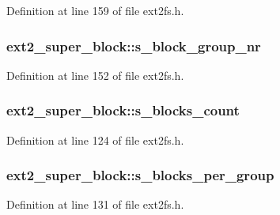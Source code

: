 \-Definition at line 159 of file ext2fs.\-h.

\hypertarget{structext2__super__block_aa69ff4c80207a79de2464e3065df607c}{
\subsubsection[{s\-\_\-block\-\_\-group\-\_\-nr}]{ {\bf ext2\-\_\-super\-\_\-block\-::s\-\_\-block\-\_\-group\-\_\-nr}}}\label{structext2__super__block_aa69ff4c80207a79de2464e3065df607c}


\-Definition at line 152 of file ext2fs.\-h.

\hypertarget{structext2__super__block_a3878ffaff13c625cce6b825ecb797547}{
\subsubsection[{s\-\_\-blocks\-\_\-count}]{ {\bf ext2\-\_\-super\-\_\-block\-::s\-\_\-blocks\-\_\-count}}}\label{structext2__super__block_a3878ffaff13c625cce6b825ecb797547}


\-Definition at line 124 of file ext2fs.\-h.

\hypertarget{structext2__super__block_a037ab0266050cd0d0026c5da1fda3ab1}{
\subsubsection[{s\-\_\-blocks\-\_\-per\-\_\-group}]{ {\bf ext2\-\_\-super\-\_\-block\-::s\-\_\-blocks\-\_\-per\-\_\-group}}}\label{structext2__super__block_a037ab0266050cd0d0026c5da1fda3ab1}


\-Definition at line 131 of file ext2fs.\-h.

